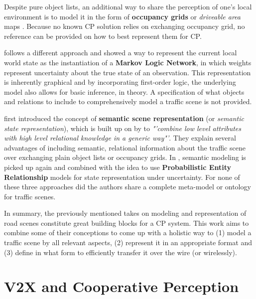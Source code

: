 Despite pure object lists, an additional way to share the perception of one's local environment is to model it in the form of \textbf{occupancy grids} or \textit{driveable area} maps \cite{pieringermodellierung}. Because no known CP solution relies on exchanging occupancy grid, no reference can be provided on how to best represent them for CP.

\cite{Stiller2012} follows a different approach and showed a way to represent the current local world state as the instantiation of a \textbf{Markov Logic Network}, in which weights represent uncertainty about the true state of an observation. This representation is inherently graphical and by incorporating first-order logic, the underlying model also allows for basic inference, in theory. A specification of what objects and relations to include to comprehensively model a traffic scene is not provided.

\cite{Kohlhaas2014} first introduced the concept of \textbf{semantic scene representation} (or \textit{semantic state representation}), which is built up on by \cite{Wolf2018} to \textit{"'combine low level attributes with high level relational knowledge in a generic way"'}. They explain several advantages of including semantic, relational information about the traffic scene over exchanging plain object lists or occupancy grids. In \cite{Petrich2018}, semantic modeling is picked up again and combined with the idea to use \textbf{Probabilistic Entity Relationship} models for state representation under uncertainty. For none of these three approaches did the authors share a complete meta-model or ontology for traffic scenes.
\par
\bigskip

In summary, the previously mentioned takes on modeling and representation of road scenes constitute great building blocks for a CP system. This work aims to combine some of their conceptions to come up with a holistic way to (1) model a traffic scene by all relevant aspects, (2) represent it in an appropriate format and (3) define in what form to efficiently transfer it over the wire (or wirelessly). 

\section{V2X and Cooperative Perception}
\label{sec:related_work:v2x_cooperative_perception}